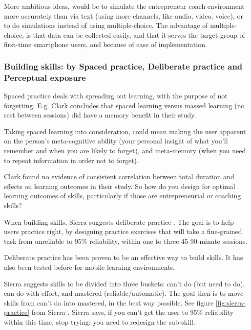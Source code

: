   More ambitious ideas, would be to simulate the entrepreneur coach environment more accurately than via text (using more channels, like audio, video, voice), or to do simulations instead of using multiple-choice. The advantage of multiple-choice, is that data can be collected easily, and that it serves the target group of first-time smartphone users, and because of ease of implementation.

  \subsubsection{Building skills: by Spaced practice, Deliberate practice and Perceptual exposure}

  Spaced practice deals with spreading out learning, with the purpose of not forgetting. E.g. Clark \citep{gates} concludes that spaced learning versus massed learning (no rest between sessions) did have a memory benefit in their study.

  Taking spaced learning into consideration, could mean making the user apparent on the person's meta-cognitive ability (your personal insight of what you'll remember and when you are likely to forget), and meta-memory (when you need to repeat information in order not to forget).

  Clark \citep{gates} found no evidence of consistent correlation between total duration and effects on learning outcomes in their study. So how do you design for optimal learning outcomes of skills, particularly if those are entrepreneurial or coaching skills?

  When building skills, Sierra suggests deliberate practice \citep{yengin} \citep{sierra}. The goal is to help users practice right, by designing practice exercises that will take a fine-grained task from unreliable to 95\% reliability, within one to three 45-90-minute sessions.

  Deliberate practice has been proven to be an effective way to build skills. It has also been tested before for mobile learning environments. \citep{yengin}

  Sierra \citep{sierra} suggests skills to be divided into three buckets: can't do (but need to do), can do with effort, and mastered (reliable/automatic). The goal then is to move skills from can't do into mastered, in the best way possible. See figure \ref{fig:sierra-practice} from Sierra \citep{sierra}. Sierra says, if you can’t get the user to 95\% reliability within this time, stop trying; you need to redesign the sub-skill. \citep{sierra}

